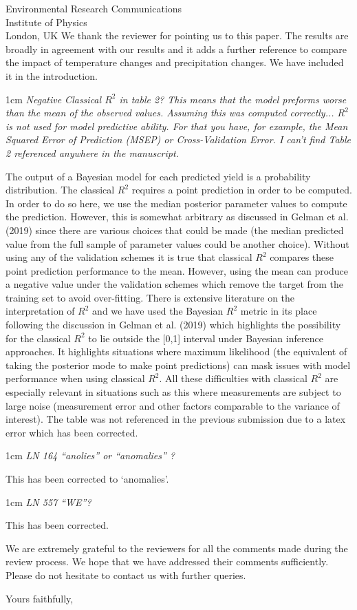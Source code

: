 \documentclass{letter}
\newcommand{\review}[1]{   
    \begin{adjustwidth}{1cm}{}
    \em{#1}
    \end{adjustwidth}
    }
\begin{document}
\begin{letter}{Environmental Research Communications \\ Institute of Physics \\ London, UK}
We thank the reviewer for pointing us to this paper. The results are broadly in agreement with our results and it adds a further reference to compare the impact of temperature changes and precipitation changes. We have included it in the introduction.

\review{
Negative Classical $R^2$ in table 2? This means that the model preforms worse than the mean of the observed values. Assuming this was computed correctly... $R^2$ is not used for model predictive ability. For that you have, for example, the Mean Squared Error of Prediction (MSEP) or Cross-Validation Error. I can’t find Table 2 referenced anywhere in the manuscript.
}

The output of a Bayesian model for each predicted yield is a probability distribution. The classical $R^2$ requires a point prediction in order to be computed. In order to do so here, we use the median posterior parameter values to compute the prediction. However, this is somewhat arbitrary as discussed in Gelman et al. (2019) since there are various choices that could be made (the median predicted value from the full sample of parameter values could be another choice). Without using any of the validation schemes it is true that classical $R^2$ compares these point prediction performance to the mean. However, using the mean can produce a negative value under the validation schemes which remove the target from the training set to avoid over-fitting. There is extensive literature on the interpretation of $R^2$ and we have used the Bayesian $R^2$ metric in its place following the discussion in Gelman et al. (2019) which highlights the possibility for the classical $R^2$ to lie outside the [0,1] interval under Bayesian inference approaches. It highlights situations where maximum likelihood (the equivalent of taking the posterior mode to make point predictions) can mask issues with model performance when using classical $R^2$. All these difficulties with classical $R^2$ are especially relevant in situations such as this where measurements are subject to large noise (measurement error and other factors comparable to the variance of interest). The table was not referenced in the previous submission due to a latex error which has been corrected. 

\review{
LN 164 “anolies” or “anomalies” ?
}

This has been corrected to `anomalies'.

\review{
LN 557 “WE”?
}

This has been corrected.

We are extremely grateful to the reviewers for all the comments made during the review process. We hope that we have addressed their comments sufficiently. Please do not hesitate to contact us with further queries.

\closing{Yours faithfully,}

\end{letter}
\end{document}
